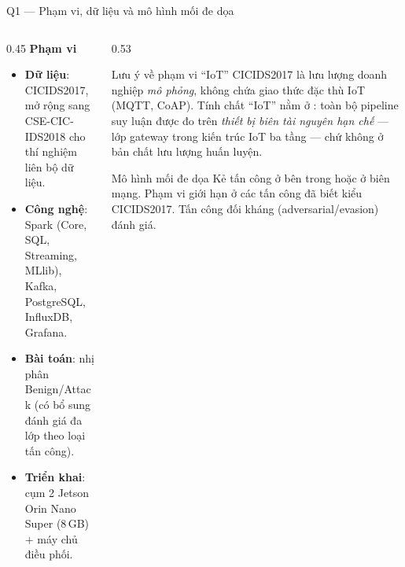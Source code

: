 \documentclass[aspectratio=169, 11pt]{beamer}
\begin{document}
\begin{frame}[label=bk-scope]{Q1 --- Phạm vi, dữ liệu và mô hình mối đe dọa}
  \begin{columns}[T]
    \begin{column}{0.45\textwidth}
      \textbf{Phạm vi}
      \begin{itemize}\small
        \item \textbf{Dữ liệu}: CICIDS2017, mở rộng sang CSE-CIC-IDS2018 cho
              thí nghiệm liên bộ dữ liệu.
        \item \textbf{Công nghệ}: Spark (Core, SQL, Streaming, MLlib), Kafka,
              PostgreSQL, InfluxDB, Grafana.
        \item \textbf{Bài toán}: nhị phân Benign/Attack (có bổ sung đánh giá đa
              lớp theo loại tấn công).
        \item \textbf{Triển khai}: cụm 2 Jetson Orin Nano Super (8\,GB) $+$ máy
              chủ điều phối.
      \end{itemize}
    \end{column}
    \begin{column}{0.53\textwidth}
      \begin{alertblock}{Lưu ý về phạm vi ``IoT''}
        \footnotesize
        CICIDS2017 là lưu lượng doanh nghiệp \emph{mô phỏng}, không chứa giao
        thức đặc thù IoT (MQTT, CoAP). Tính chất ``IoT'' nằm ở : toàn bộ pipeline suy luận được đo trên \emph{thiết bị biên
        tài nguyên hạn chế} --- lớp gateway trong kiến trúc IoT ba tầng --- chứ
        không ở bản chất lưu lượng huấn luyện.
      \end{alertblock}
      \begin{block}{Mô hình mối đe dọa}
        \footnotesize
        Kẻ tấn công ở bên trong hoặc ở biên mạng. Phạm vi giới hạn ở các tấn
        công đã biết kiểu CICIDS2017. Tấn công đối kháng (adversarial/evasion)
         đánh giá.
      \end{block}
    \end{column}
  \end{columns}
\end{frame}
\end{document}
